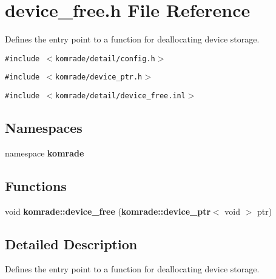 \section{device\_\-free.h File Reference}
\label{device__free_8h}
Defines the entry point to a function for deallocating device storage. 

{\tt \#include $<$komrade/detail/config.h$>$}\par
{\tt \#include $<$komrade/device\_\-ptr.h$>$}\par
{\tt \#include $<$komrade/detail/device\_\-free.inl$>$}\par
\subsection*{Namespaces}
\begin{CompactItemize}
\item 
namespace {\bf komrade}
\end{CompactItemize}
\subsection*{Functions}
\begin{CompactItemize}
\item 
void {\bf komrade::device\_\-free} ({\bf komrade::device\_\-ptr}$<$ void $>$ ptr)
\end{CompactItemize}


\subsection{Detailed Description}
Defines the entry point to a function for deallocating device storage. 

